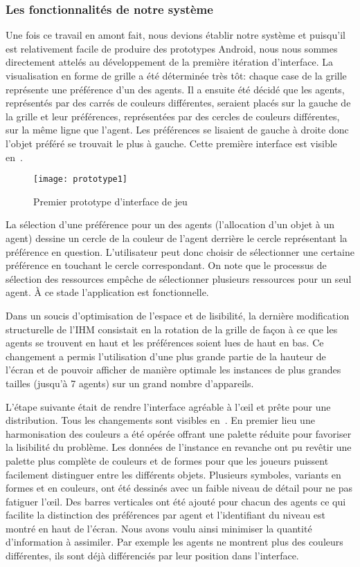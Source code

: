\documentclass[../main.tex]{subfiles}
\begin{document}
	\subsubsection{Les fonctionnalités de notre système}

Une fois ce travail en amont fait, nous devions établir notre système et puisqu'il est relativement facile de produire des prototypes Android, nous nous sommes directement attelés au développement de la première itération d'interface. La visualisation en forme de grille a été déterminée très tôt: chaque case de la grille représente une préférence d'un des agents. Il a ensuite été décidé que les agents, représentés par des carrés de couleurs différentes, seraient placés sur la gauche de la grille et leur préférences, représentées par des cercles de couleurs différentes, sur la même ligne que l'agent. Les préférences se lisaient de gauche à droite donc l'objet préféré se trouvait le plus à gauche. Cette première interface est visible en~.

\begin{figure}[ht!]
\centering
\texttt{[image: prototype1]}
\caption{Premier prototype d'interface de jeu}
\label{fig-prototype1}
\end{figure}

La sélection d'une préférence pour un des agents (l'allocation d'un objet à un agent) dessine un cercle de la couleur de l'agent derrière le cercle représentant la préférence en question. L'utilisateur peut donc choisir de sélectionner une certaine préférence en touchant le cercle correspondant. On note que le processus de sélection des ressources empêche de sélectionner plusieurs ressources pour un seul agent. À ce stade l'application est fonctionnelle.

Dans un soucis d'optimisation de l'espace et de lisibilité, la dernière modification structurelle de l'IHM consistait en la rotation de la grille de façon à ce que les agents se trouvent en haut et les préférences soient lues de haut en bas. Ce changement a permis l'utilisation d'une plus grande partie de la hauteur de l'écran et de pouvoir afficher de manière optimale les instances de plus grandes tailles (jusqu'à 7 agents) sur un grand nombre d'appareils.

L'étape suivante était de rendre l'interface agréable à l'œil et prête pour une distribution. Tous les changements sont visibles en~. En premier lieu une harmonisation des couleurs a été opérée offrant une palette réduite pour favoriser la lisibilité du problème. Les données de l'instance en revanche ont pu revêtir une palette plus complète de couleurs et de formes pour que les joueurs puissent facilement distinguer entre les différents objets. Plusieurs symboles, variants en formes et en couleurs, ont été dessinés avec un faible niveau de détail pour ne pas fatiguer l'œil. Des barres verticales ont été ajouté pour chacun des agents ce qui facilite la distinction des préférences par agent et l'identifiant du niveau est montré en haut de l'écran. Nous avons voulu ainsi minimiser la quantité d'information à assimiler. Par exemple les agents ne montrent plus des couleurs différentes, ils sont déjà différenciés par leur position dans l'interface.
\end{document}
